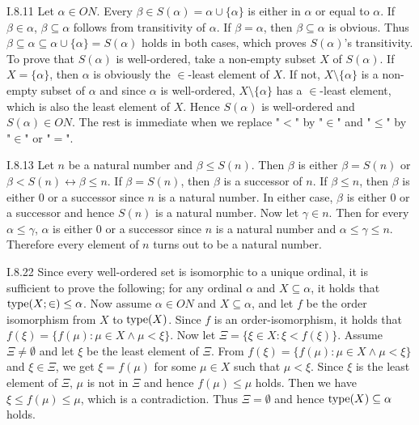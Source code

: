\documentclass[12pt]{article}
\begin{document}
\begin{customthm}{I.8.11}
  Let $\alpha\in ON$. Every $\beta\in S(\alpha)=\alpha\cup\{\alpha\}$ is either in $\alpha$ or equal to $\alpha$. If $\beta\in\alpha$, $\beta\subseteq\alpha$ follows from transitivity of $\alpha$. If $\beta=\alpha$, then $\beta\subseteq \alpha$ is obvious. Thus $\beta\subseteq\alpha\subseteq\alpha\cup\{\alpha\}=S(\alpha)$ holds in both cases, which proves $S(\alpha)$'s transitivity. To prove that $S(\alpha)$ is well-ordered, take a non-empty subset $X$ of $S(\alpha)$. If $X=\{\alpha\}$, then $\alpha$ is obviously the $\in$-least element of $X$. If not, $X\setminus\{\alpha\}$ is a non-empty subset of $\alpha$ and since $\alpha$ is well-ordered, $X\setminus\{\alpha\}$ has a $\in$-least element, which is also the least element of $X$. Hence $S(\alpha)$ is well-ordered and $S(\alpha)\in ON$. The rest is immediate when we replace "$<$" by "$\in$" and "$\leq$" by "$\in$" or "$=$".
\end{customthm}

\begin{customthm}{I.8.13}
  Let $n$ be a natural number and $\beta\leq S(n)$. Then $\beta$ is either $\beta=S(n)$ or $\beta<S(n)\leftrightarrow\beta\leq n$. If $\beta=S(n)$, then $\beta$ is a successor of $n$. If $\beta\leq n$, then $\beta$ is either 0 or a successor since $n$ is a natural number. In either case, $\beta$ is either 0 or a successor and hence $S(n)$ is a natural number. Now let $\gamma\in n$. Then for every $\alpha\leq\gamma$, $\alpha$ is either 0 or a successor since $n$ is a natural number and $\alpha\leq\gamma\leq n$. Therefore every element of $n$ turns out to be a natural number.
\end{customthm}

\begin{customthm}{I.8.22}
  Since every well-ordered set is isomorphic to a unique ordinal, it is sufficient to prove the following; for any ordinal $\alpha$ and $X\subseteq\alpha$, it holds that $\mathop{\mathrm{type}}(X;\in)\leq\alpha$. Now assume $\alpha\in ON$ and  $X\subseteq\alpha$, and let $f$ be the order isomorphism from $X$ to $\mathop{\mathrm{type}}(X)$. Since $f$ is an order-isomorphism, it holds that $f(\xi)=\{f(\mu):\mu\in X\wedge\mu<\xi\}$. Now let $\Xi = \{\xi\in X:\xi<f(\xi)\}$. Assume $\Xi\neq\emptyset$ and let $\xi$ be the least element of $\Xi$. From $f(\xi)=\{f(\mu):\mu\in X\wedge\mu<\xi\}$ and $\xi\in\Xi$, we get $\xi=f(\mu)$ for some $\mu\in X$ such that $\mu<\xi$. Since $\xi$ is the least element of $\Xi$, $\mu$ is not in $\Xi$ and hence $f(\mu)\leq\mu$ holds. Then we have $\xi\leq f(\mu)\leq\mu$, which is a contradiction. Thus $\Xi=\emptyset$ and hence $\mathop{\mathrm{type}}(X)\subseteq\alpha$ holds.
\end{customthm}
\end{document}
